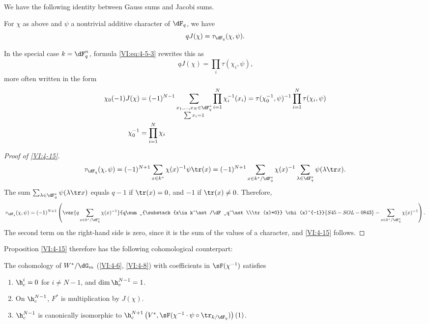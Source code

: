 We have the following identity between Gauss sums and Jacobi sums. 





\begin{proposition_}\label{VI:4-15}
For $\chi$ as above and $\psi$ a nontrivial additive character of 
$\dF_q$, we have 
\[
  q J(\chi) = \tau_{\dF_q}(\chi,\psi) \text{.} 
\]
\end{proposition_}

In the special case $k=\dF_q^n$, formula \eqref{VI:eq:4-5-3} rewrites this as 
\begin{equation*}\tag{4.15.1}\label{VI:eq:4-15-1}
  q J(\chi) = \prod_i \tau(\chi_i,\psi) \text{,} 
\end{equation*}
more often written in the form 
\begin{align*}
  \chi_0(-1) J(\chi) &= (-1)^{N-1} \sum_{\substack{x_1,\dots,x_N\in \dF_q^\ast \\ \sum x_i = 1}} \prod_{i=1}^N \chi_i^{-1}(x_i) = \tau(\chi_0^{-1},\psi)^{-1} \prod_{i=1}^N \tau(\chi_i,\psi) \\
  \chi_0^{-1} &= \prod_{i=1}^N \chi_i 
\end{align*}





\begin{proof}[Proof of \ref{VI:4-15}]
\[
  \tau_{\dF_q}(\chi,\psi) = (-1)^{N+1} \sum_{x\in k^\ast} \chi(x)^{-1} \psi \tr(x) = (-1)^{N+1} \sum_{x\in k^\ast/\dF_q^\ast} \chi(x)^{-1} \sum_{\lambda\in \dF_q^\ast} \psi(\lambda \tr x) \text{.}
\]
The sum $\sum_{\lambda\in \dF_q^\ast} \psi(\lambda \tr x)$ equals $q-1$ if 
$\tr(x)=0$, and $-1$ if $\tr(x)\ne 0$. Therefore, 
\[
  \tau_{\dF_q}(\chi,\psi) = (-1)^{N+1} \left(\var{q\sum_{x\in k^\ast/\dF_q^\ast} \chi(x)^{-1}}{q\sum_{\substack{x\in k^\ast/\dF_q^\ast\\\tr(x)=0}} \chi(x)^{-1}}{S45-SOL-0843} - \sum_{x\in k^\ast/\dF_q^\ast} \chi(x)^{-1}\right) \text{.}
\]
The second term on the right-hand side is zero, since it is the sum of the values 
of a character, and \ref{VI:4-15} follows. 
\end{proof}

Proposition \ref{VI:4-15} therefore has the following cohomological counterpart: 





\begin{proposition_}\label{VI:4-16}
The cohomology of $W^\ast/\dG_m$ (\ref{VI:4-6}, \ref{VI:4-8}) with coefficients 
in $\sF(\chi^{-1})$ satisfies 
\begin{enumerate}[\indent (i)]
  \item $\h_c^i=0$ for $i\ne N-1$, and $\dim \h_c^{N-1}{}=1$. 
  \item On $\h_c^{N-1}$, $F^\ast$ is multiplication by $J(\chi)$. 
  \item $\h_c^{N-1}$ is canonically isomorphic to 
    $\h_c^{N+1}\left(V^\ast,\sF(\chi^{-1}\cdot \psi\circ \tr_{k/\dF_q})\right)(1)$. 
\end{enumerate}
\end{proposition_}

